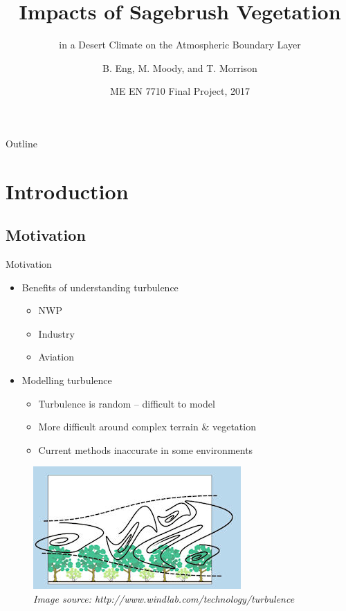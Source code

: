 \documentclass{beamer}
\title{Impacts of Sagebrush Vegetation }
\subtitle{in a Desert Climate on the Atmospheric Boundary Layer}
\author{B. Eng, M. Moody, and T. Morrison}
\institute[University of Utah] %
{
  Department of Mechanical Engineering\\
  University of Utah}
\date{ME EN 7710 Final Project, 2017}
\begin{document}
\begin{frame}
  \titlepage
\end{frame}

\begin{frame}{Outline}
  \tableofcontents
\end{frame}



\section{Introduction}

\subsection{Motivation}
\begin{frame}{Motivation}


	\begin{itemize}
	\item {Benefits of understanding turbulence}
		\begin{itemize}
		\item {NWP}
		\item {Industry}
		\item {Aviation}
		\end{itemize}
	\item {Modelling turbulence}
		\begin{itemize}
		\item {Turbulence is random -- difficult to model}
		\item {More difficult around complex terrain \& vegetation}
		\item {Current methods inaccurate in some environments}
		\end{itemize}
	\end{itemize}
	\begin{figure}
		\includegraphics[scale=.4]{pictures/canopy.jpg}
\\ \tiny{\textit{Image source: http://www.windlab.com/technology/turbulence}}
	\end{figure}


\end{frame}
\end{document}
